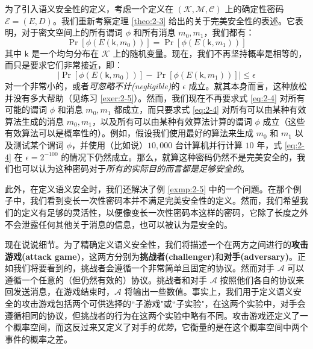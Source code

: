 为了引入语义安全性的定义，考虑一个定义在 $(\mathcal{K},\mathcal{M},\mathcal{C})$ 上的确定性密码 $\mathcal{E}=(E,D)$。我们重新考察定理 \ref{theo:2-3} 给出的关于完美安全性的表述。它表明，对于密文空间上的所有谓词 $\phi$ 和所有消息 $m_0,m_1$，我们都有：
\begin{equation}\label{eq:2-3}
\Pr[\phi(E(\mathsf{k},m_0))]=\Pr[\phi(E(\mathsf{k}, m_1))]
\end{equation}
其中 $\mathsf{k}$ 是一个均匀分布在 $\mathcal{K}$ 上的随机变量。现在，我们不再坚持概率是相等的，而只是要求它们非常接近，即：
\begin{equation}\label{eq:2-4}
\Big\lvert
\Pr[\phi(E(\mathsf{k},m_0))]-\Pr[\phi(E(\mathsf{k}, m_1))]
\Big\rvert
\leq\epsilon
\end{equation}
对一个非常小的，或者\emph{可忽略不计(negligible)}的 $\epsilon$ 成立。就其本身而言，这种放松并没有多大帮助（见练习 \ref{exer:2-5}）。然而，我们现在不再要求式 \ref{eq:2-4} 对所有可能的谓词 $\phi$ 和消息 $m_0,m_1$ 都成立，而只要求式 \ref{eq:2-4} 对所有可以由某种有效算法生成的消息 $m_0,m_1$，以及所有可以由某种有效算法计算的谓词 $\phi$ 成立（这些有效算法可以是概率性的）。例如，假设我们使用最好的算法来生成 $m_0$ 和 $m_1$ 以及测试某个谓词 $\phi$，并使用（比如说）$10,000$ 台计算机并行计算 $10$ 年，式 \ref{eq:2-4} 在 $\epsilon = 2^{-100}$ 的情况下仍然成立。那么，就算这种密码仍然不是完美安全的，我们也可以认为这种密码对于\emph{所有的实际目的而言都是足够安全的}。

此外，在定义语义安全时，我们还解决了例 \ref{exmp:2-5} 中的一个问题。在那个例子中，我们看到变长一次性密码本并不满足完美安全性的定义。然而，我们希望我们的定义有足够的灵活性，以便像变长一次性密码本这样的密码，它除了长度之外不会泄露任何其他关于消息的信息，也可以被认为是安全的。

现在说说细节。为了精确定义语义安全性，我们将描述一个在两方之间进行的\textbf{攻击游戏(attack game)}，这两方分别为\textbf{挑战者(challenger)}和\textbf{对手(adversary)}。正如我们将要看到的，挑战者会遵循一个非常简单且固定的协议。然而对手 $\mathcal{A}$ 可以遵循一个任意的（但仍然有效的）协议。挑战者和对手 $\mathcal{A}$ 按照他们各自的协议来回发送消息，在游戏结束时，$\mathcal{A}$ 将输出一些数值。事实上，我们用于定义语义安全的攻击游戏包括两个可供选择的``子游戏"或``子实验"，在这两个实验中，对手会遵循相同的协议，但挑战者的行为在这两个实验中略有不同。攻击游戏还定义了一个概率空间，而这反过来又定义了对手的\emph{优势}，它衡量的是在这个概率空间中两个事件的概率之差。


